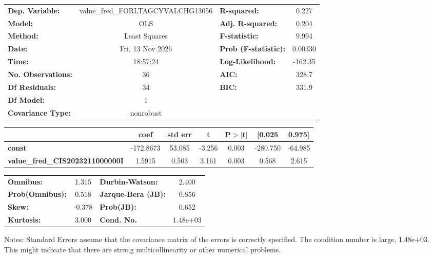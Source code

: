 \begin{center}
\begin{tabular}{lclc}
\toprule
\textbf{Dep. Variable:}                 & value\_fred\_FORLTAGCYVALCHG13056 & \textbf{  R-squared:         } &     0.227   \\
\textbf{Model:}                         &                OLS                & \textbf{  Adj. R-squared:    } &     0.204   \\
\textbf{Method:}                        &           Least Squares           & \textbf{  F-statistic:       } &     9.994   \\
\textbf{Date:}                          &          Fri, 13 Nov 2026         & \textbf{  Prob (F-statistic):} &  0.00330    \\
\textbf{Time:}                          &              18:57:24             & \textbf{  Log-Likelihood:    } &   -162.35   \\
\textbf{No. Observations:}              &                   36              & \textbf{  AIC:               } &     328.7   \\
\textbf{Df Residuals:}                  &                   34              & \textbf{  BIC:               } &     331.9   \\
\textbf{Df Model:}                      &                    1              & \textbf{                     } &             \\
\textbf{Covariance Type:}               &             nonrobust             & \textbf{                     } &             \\
\bottomrule
\end{tabular}
\begin{tabular}{lcccccc}
                                        & \textbf{coef} & \textbf{std err} & \textbf{t} & \textbf{P$> |$t$|$} & \textbf{[0.025} & \textbf{0.975]}  \\
\midrule
\textbf{const}                          &    -172.8673  &       53.085     &    -3.256  &         0.003        &     -280.750    &      -64.985     \\
\textbf{value\_fred\_CIS2023211000000I} &       1.5915  &        0.503     &     3.161  &         0.003        &        0.568    &        2.615     \\
\bottomrule
\end{tabular}
\begin{tabular}{lclc}
\textbf{Omnibus:}       &  1.315 & \textbf{  Durbin-Watson:     } &    2.400  \\
\textbf{Prob(Omnibus):} &  0.518 & \textbf{  Jarque-Bera (JB):  } &    0.856  \\
\textbf{Skew:}          & -0.378 & \textbf{  Prob(JB):          } &    0.652  \\
\textbf{Kurtosis:}      &  3.000 & \textbf{  Cond. No.          } & 1.48e+03  \\
\bottomrule
\end{tabular}
\end{center}

Notes: \newline
 [1] Standard Errors assume that the covariance matrix of the errors is correctly specified. \newline
 [2] The condition number is large, 1.48e+03. This might indicate that there are \newline
 strong multicollinearity or other numerical problems.